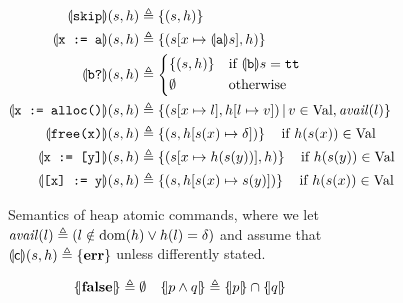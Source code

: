 \begin{figure}[t]
	\begin{subfigure}[t]{\linewidth}
		\centering
		\begin{align*}
			\edenot{\code{skip}} (s, h)         & \eqdef \{ (s, h) \}                                                                                    \\
			\edenot{\code{x := a}} (s, h)       & \eqdef \left\lbrace (s[x \mapsto \edenot{\code{a}} s], h) \right\rbrace                                \\
			\edenot{\code{b?}} (s, h)           & \eqdef \begin{cases*}
				                                             \left\lbrace (s, h) \right\rbrace & if $\edenot{\code{b}} s = \code{tt}$ \\
				                                             \emptyset                         & otherwise
			                                             \end{cases*}    \\
			\edenot{\code{x := alloc()}} (s, h) & \eqdef \left\lbrace (s[x \mapsto l], h[l \mapsto v]) \svert v \in \Val, \mathit{avail}(l)\right\rbrace \\
			\edenot{\code{free(x)}} (s, h)      & \eqdef
			\left\lbrace (s, h[s(x) \mapsto \delta]) \right\rbrace\quad \text{if}~h(s(x)) \in \Val                                                       \\
			\edenot{\code{x := [y]}} (s, h)     & \eqdef
			\left\lbrace (s[x \mapsto h(s(y))], h) \right\rbrace\quad \text{if}~h(s(y)) \in \Val                                                         \\
			\edenot{\code{[x] := y}} (s, h)     & \eqdef
			\left\lbrace (s, h[s(x) \mapsto s(y)]) \right\rbrace \quad \text{if}~h(s(x)) \in \Val
		\end{align*}
		\caption{Semantics of heap atomic commands, where we let $\mathit{avail}(l) \triangleq (l \notin \text{dom}(h) \lor h(l) = \delta)$ and assume that $\llparenthesis\mathsf{c}\rrparenthesis (s, h)\triangleq \left\lbrace \textbf{err} \right\rbrace$ unless differently stated.}
		\label{fig:sil:ssil-model-commands}
	\end{subfigure}
	\begin{subfigure}[t]{\linewidth}
		\vspace*{1ex}
		\centering
		\begin{align*}
			 & \asldenot{\false} \eqdef \emptyset                                                                                                          &  & \asldenot{p \land q} \eqdef \asldenot{p} \cap \asldenot{q}    \\

\end{align*}
\end{subfigure}
\end{figure}
